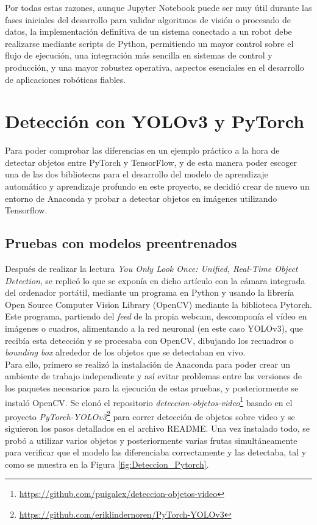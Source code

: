 Por todas estas razones, aunque Jupyter Notebook puede ser muy útil durante las fases iniciales del desarrollo para validar algoritmos de visión o procesado de datos, la implementación definitiva de un sistema conectado a un robot debe realizarse mediante scripts de Python, permitiendo un mayor control sobre el flujo de ejecución, una integración más sencilla en sistemas de control y producción, y una mayor robustez operativa, aspectos esenciales en el desarrollo de aplicaciones robóticas fiables.


\section{Detección con YOLOv3 y PyTorch}
\label{exp_seleccion_algoritmo}

Para poder comprobar las diferencias en un ejemplo práctico a la hora de detectar objetos entre PyTorch y TensorFlow, y de esta manera poder escoger una de las dos bibliotecas para el desarrollo del modelo de aprendizaje automático y aprendizaje profundo en este proyecto, se decidió crear de nuevo un entorno de Anaconda y probar a detectar objetos en imágenes utilizando Tensorflow.

\subsection{Pruebas con modelos preentrenados}
\label{sec:Pruebas_modelo_preentrenado_Pytorch}

Después de realizar la lectura \textit{You Only Look Once: Unified, Real-Time Object Detection}\cite{Redmon16}, se replicó lo que se exponía en dicho artículo con la cámara integrada del ordenador portátil, mediante un programa en Python y usando la librería Open Source Computer Vision Library (OpenCV) mediante la biblioteca Pytorch. Este programa, partiendo del \textit{feed} de la propia webcam, descomponía el vídeo en imágenes o cuadros, alimentando a la red neuronal (en este caso YOLOv3), que recibía esta detección y se procesaba con OpenCV, dibujando los recuadros o \textit{bounding box} alrededor de los objetos que se detectaban en vivo.\\

Para ello, primero se realizó la instalación de Anaconda para poder crear un ambiente de trabajo independiente y así evitar problemas entre las versiones de los paquetes necesarios para la ejecución de estas pruebas, y posteriormente se instaló OpenCV. Se clonó el repositorio \textit{deteccion-objetos-video}\footnote{\url{https://github.com/puigalex/deteccion-objetos-video}} basado en el proyecto \textit{PyTorch-YOLOv3}\footnote{\url{https://github.com/eriklindernoren/PyTorch-YOLOv3}} para correr detección de objetos sobre video y se siguieron los pasos detallados en el archivo README.
Una vez instalado todo, se probó a utilizar varios objetos y posteriormente varias frutas simultáneamente para verificar que el modelo las diferenciaba correctamente y las detectaba, tal y como se muestra en la Figura \ref{fig:Deteccion_Pytorch}.


